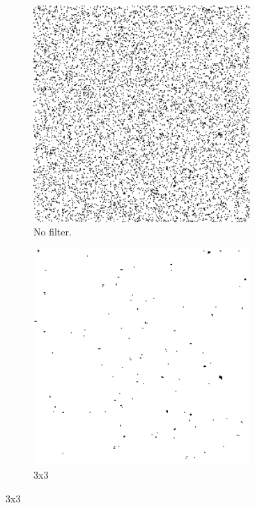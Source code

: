 \begin{figure}[h]
    \centering

    \begin{subfigure}{0.3\textwidth}
        \includegraphics[width=0.9\textwidth]{../code/2_out/2-1_sp.png}
        \caption{No filter.}
        \label{fig:2-2-1:1}
    \end{subfigure}
    \begin{subfigure}{0.3\textwidth}
        \includegraphics[width=0.9\textwidth]{../code/2_out/2-2_sp_3x3.png}
        \caption{3x3}
        \label{fig:2-2-1:2}
    \end{subfigure}


\end{figure}
